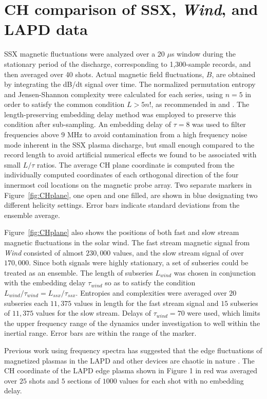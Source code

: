 \documentclass[aps,prx,twocolumn,secnumarabic,nobalancelastpage,amsmath,amssymb,
nofootinbib]{revtex4-1}
\begin{document}
\section{CH comparison of SSX, \textit{Wind}, and LAPD data}
SSX magnetic fluctuations were analyzed over a 20 $\mu$s window during the stationary period of the discharge, corresponding to 1,300-sample records, and then averaged over 40 shots. Actual magnetic field fluctuations, $B$, are obtained by integrating the dB/dt signal over time. The normalized permutation entropy and Jensen-Shannon complexity were calculated for each series, using $n=5$ in order to satisfy the common condition $L > 5n!$, as recommended in \cite{amigo2008} and \cite{riedl2013}. The length-preserving embedding delay method was employed to preserve this condition after sub-sampling. An embedding delay of $\tau=8$ was used to filter frequencies above 9 MHz to avoid contamination from a high frequency noise mode inherent in the SSX plasma discharge, but small enough compared to the record length to avoid artificial numerical effects we found to be associated with small $L/ \tau$ ratios. The average CH plane coordinate is computed from the individually computed coordinates of each orthogonal direction of the four innermost coil locations on the magnetic probe array. Two separate markers in Figure~\ref{fig:CHplane}, one open and one filled, are shown in blue designating two different helicity settings. Error bars indicate standard deviations from the ensemble average.  

Figure~\ref{fig:CHplane} also shows the positions of both fast and slow stream magnetic fluctuations in the solar wind.  The fast stream magnetic signal from \textit{Wind} consisted of almost $230,000$ values, and the slow stream signal of over $170,000$. Since both signals were highly stationary, a set of subseries could be treated as an ensemble. The length of subseries $L_{wind}$ was chosen in conjunction with the embedding delay $\tau_{wind}$ so as to satisfy the condition $L_{wind}/\tau_{wind} = L_{ssx}/\tau_{ssx}$. Entropies and complexities were averaged over $20$ subseries each $11,375$ values in length for the fast stream signal and $15$ subseries of $11,375$ values for the slow stream. Delays of $\tau_{wind} = 70$ were used, which limits the  upper frequency range of the dynamics under investigation to well within the inertial range. Error bars are within the range of the marker.

Previous work using frequency spectra has suggested that the edge fluctuations of magnetized plasmas in the LAPD and other devices are chaotic in nature \cite{maggs2012}. The CH coordinate of the LAPD edge plasma shown in Figure 1 in red was averaged over $25$ shots and $5$ sections of $1000$ values for each shot with no embedding delay. 
\end{document}
